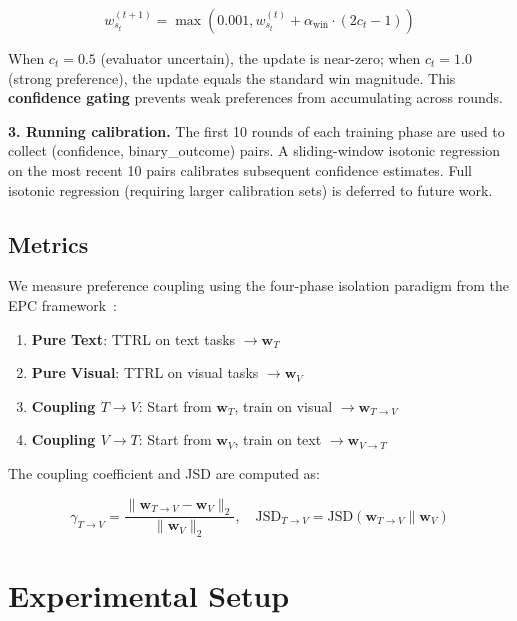 \documentclass[11pt]{article}
\begin{document}
\begin{equation}
w_{s_t}^{(t+1)} = \max\left(0.001, w_{s_t}^{(t)} + \alpha_{\text{win}} \cdot (2c_t - 1)\right)
\end{equation}

When $c_t = 0.5$ (evaluator uncertain), the update is near-zero; when $c_t = 1.0$ (strong preference), the update equals the standard win magnitude. This \textbf{confidence gating} prevents weak preferences from accumulating across rounds.

\textbf{3. Running calibration.} The first 10 rounds of each training phase are used to collect (confidence, binary\_outcome) pairs. A sliding-window isotonic regression on the most recent 10 pairs calibrates subsequent confidence estimates. Full isotonic regression (requiring larger calibration sets) is deferred to future work.

\subsection{Metrics}

We measure preference coupling using the four-phase isolation paradigm from the EPC framework~\cite{liu2026epc}:

\begin{enumerate}[leftmargin=*,nosep]
 \item \textbf{Pure Text}: TTRL on text tasks $\rightarrow \mathbf{w}_T$
 \item \textbf{Pure Visual}: TTRL on visual tasks $\rightarrow \mathbf{w}_V$
 \item \textbf{Coupling $T{\to}V$}: Start from $\mathbf{w}_T$, train on visual $\rightarrow \mathbf{w}_{T\to V}$
 \item \textbf{Coupling $V{\to}T$}: Start from $\mathbf{w}_V$, train on text $\rightarrow \mathbf{w}_{V\to T}$
\end{enumerate}

The coupling coefficient and JSD are computed as:

\begin{equation}
\gamma_{T\to V} = \frac{\|\mathbf{w}_{T\to V} - \mathbf{w}_V\|_2}{\|\mathbf{w}_V\|_2}, \quad
\text{JSD}_{T\to V} = \text{JSD}(\mathbf{w}_{T\to V} \parallel \mathbf{w}_V)
\end{equation}

\section{Experimental Setup}
\end{document}
